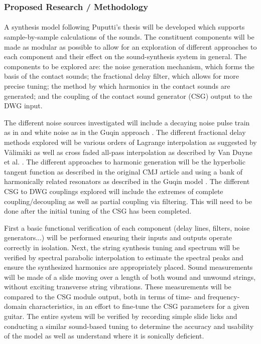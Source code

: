 \documentclass[12pt]{article}
\begin{document}
\subsubsection*{Proposed Research / Methodology}
\paragraph{}
A synthesis model following Puputti's thesis will be developed which supports sample-by-sample calculations of the sounds. The constituent components will be made as modular as possible to allow for an exploration of different approaches to each component and their effect on the sound-synthesis system in general. The components to be explored are: the noise generation mechanism, which forms the basis of the contact sounds; the fractional delay filter, which allows for more precise tuning; the method by which harmonics in the contact sounds are generated; and the coupling of the contact sound generator (CSG) output to the DWG input.

The different noise sources investigated will include a decaying noise pulse train as in \cite{pakarinen_virtual_2008} and white noise as in the Guqin approach \cite{penttinen_model-based_2006}. The different fractional delay methods explored will be various orders of Lagrange interpolation as suggested by Välimäki \cite{valimaki_discrete-time_1995} as well as cross faded all-pass interpolation as described by Van Duyne et al. \cite{duyne_lossless_1997}. The different approaches to harmonic generation will be the hyperbolic tangent function as described in the original CMJ article \cite{pakarinen_virtual_2008} and using a bank of harmonically related resonators as described in the Guqin model \cite{penttinen_model-based_2006}. The different CSG to DWG couplings explored will include the extremes of complete coupling/decoupling as well as partial coupling via filtering. This will need to be done after the initial tuning of the CSG has been completed.

First a basic functional verification of each component (delay lines, filters, noise generators...) will be performed ensuring their inputs and outputs operate correctly in isolation. Next, the string synthesis tuning and spectrum will be verified by spectral parabolic interpolation to estimate the spectral peaks and ensure the synthesized harmonics are appropriately placed. Sound measurements will be made of a slide moving over a length of both wound and unwound strings, without exciting transverse string vibrations. These measurements will be compared to the CSG module output, both in terms of time- and frequency-domain characteristics, in an effort to fine-tune the CSG parameters for a given guitar. The entire system will be verified by recording simple slide licks and conducting a similar sound-based tuning to determine the accuracy and usability of the model as well as understand where it is sonically deficient.
\end{document}
